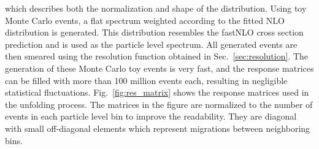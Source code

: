 which describes both the normalization and shape of the distribution. Using toy
Monte Carlo events, a flat \ptavg spectrum weighted according to the fitted NLO
distribution is generated. This distribution resembles the fastNLO cross section
prediction and is used as the particle level \ptavg spectrum. All generated
events are then smeared using the resolution function obtained in
Sec.~\ref{sec:resolution}. The generation of these Monte Carlo toy events is
very fast, and the response matrices can be filled with more than 100 million
events each, resulting in negligible statistical fluctuations.
Fig.~\ref{fig:res_matrix} shows the response matrices used in the unfolding
process. The matrices in the figure are normalized to the number of events in
each particle level bin to improve the readability. They are diagonal with small
off-diagonal elements which represent migrations between neighboring \ptavg
bins.

